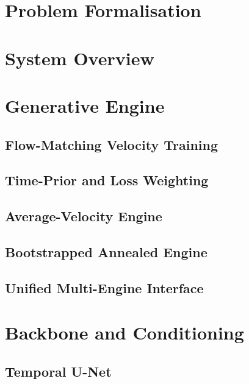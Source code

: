 \documentclass[headsepline,footsepline,footinclude=false,oneside,fontsize=11pt,paper=a4,listof=totoc,bibliography=totoc]{scrbook}
\begin{document}
\section{Problem Formalisation}\label{sec:method:formal}

\section{System Overview}\label{sec:method:overview}

\section{Generative Engine}\label{sec:method:engine}
\subsection{Flow-Matching Velocity Training}\label{sec:method:engine:fm}
\subsection{Time-Prior and Loss Weighting}\label{sec:method:engine:time}
\subsection{Average-Velocity Engine}\label{sec:method:engine:mf}
\subsection{Bootstrapped Annealed Engine}\label{sec:method:engine:af}
\subsection{Unified Multi-Engine Interface}\label{sec:method:engine:mix}

\section{Backbone and Conditioning}\label{sec:method:backbone}
\subsection{Temporal U-Net}\label{sec:method:backbone:unet}
\end{document}

